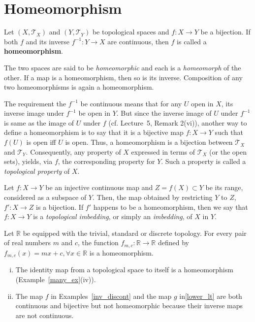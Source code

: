 \documentclass[a4paper,english,12pt]{article}
\begin{document}
\section{Homeomorphism}

\begin{defn}[Homeomorphism] Let $(X,\mathcal{T}_X)$ and $(Y,\mathcal{T}_Y)$ be topological spaces and $f:X\rightarrow Y$ be a bijection. If both $f$ and its inverse $f^{-1}:Y\rightarrow 
X$ are continuous, then $f$ is called a \textbf{homeomorphism}.
\end{defn}

The two spaces are said to be \textit{homeomorphic} and each is a \textit{homeomorph} of the other. If a map is a homeomorphism, then so is its inverse. Composition of any two homeomorphisms is again a homeomorphism.

The requirement the $f^{-1}$ be continuous means that for any $U$ open in $X$, its inverse image under $f^{-1}$ be open in $Y$. But since the inverse image of $U$ under $f^{-1}$ is same as the image of $U$ under $f$ (cf. Lecture~5, Remark 2(vi)), another way to define a homeomorphism is to say that it is a bijective map $f:X\rightarrow Y$ such that $f(U)$ is open iff $U$ is open. Thus, a homeomorphism is a bijection between $\mathcal{T}_X$ and $\mathcal{T}_Y$. Consequently, any property of $X$ expressed in terms of $\mathcal{T}_X$ (or the open sets), yields, via $f$, the corresponding property for $Y$. Such a property is called a \textit{topological property} of $X$. %

Let $f:X\rightarrow Y$ be an injective continuous map and $Z=f(X)\subset Y$ be its range, considered as a subspace of $Y$. Then, the map obtained by restricting $Y$ to $Z$, $f':X\rightarrow Z$ is a bijection. If $f'$ happens to be a homeomorphism, then we say that $f:X\rightarrow Y$ is a \textit{topological imbedding}, or simply an \textit{imbedding}, of $X$ in $Y$.

\begin{exmp}
Let $\mathbb{R}$ be equipped with the trivial, standard or discrete topology. For every pair of real numbers $m$ and $c$, the function $f_{m,c}:\mathbb{R}\rightarrow\mathbb{R}$ defined by $f_{m,c}(x)=mx+c,\forall x\in\mathbb{R}$ is a homeomorphism.
\end{exmp}

\begin{exmp}\begin{enumerate}[i)]
\item The identity map from a topological space to itself is a homeomorphism (Example~\ref{many_ex}(iv)).
\item The map $f$ in Examples~\ref{inv_discont} and the map $g$ in\ref{lower_lt} are both continuous and bijective but not homeomorphic because their inverse maps are not continuous.
\end{enumerate}
\end{exmp}
\end{document}
